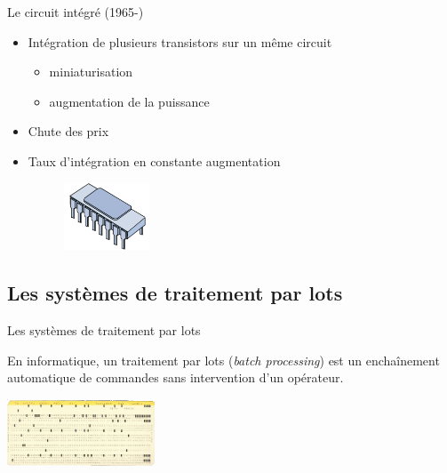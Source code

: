 \begin{frame}{Le circuit intégré (1965-)}
\begin{itemize}
\item Intégration de plusieurs transistors sur un même circuit
\begin{itemize}
\item miniaturisation
\item augmentation de la puissance
\end{itemize}
\item Chute des prix
\item Taux d'intégration en constante augmentation
\begin{figure}[tr]
	\includegraphics[height=2cm]{../illustration/circuit_integre.png}
\end{figure}
\end{itemize}
\end{frame}


\subsection{Les systèmes de traitement par lots}

\begin{frame}{Les systèmes de traitement par lots}
\begin{definition}
En informatique, un traitement par lots (\emph{batch processing}) est
un enchaînement automatique de commandes sans intervention d'un opérateur.
\end{definition}
\includegraphics[height=2cm]{../illustration/carte_jcl.png}
\end{frame}


